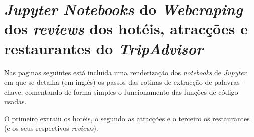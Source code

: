 \chapter{\textit{Jupyter Notebooks} do \textit{Webcraping} dos \textit{reviews} dos hotéis, atracções e restaurantes do \textit{TripAdvisor}}
\label{ap6}


Nas paginas seguintes está incluída uma renderização dos \textit{notebooks} de \textit{Jupyter} em que se detalha (em inglês) os passos das rotinas de extracção de palavras-chave, comentando de forma simples o funcionamento das funções de código usadas.

O primeiro extraiu os hotéis, o segundo as atracções e o terceiro os restaurantes  (e os seus respectivos \textit{reviews}).



